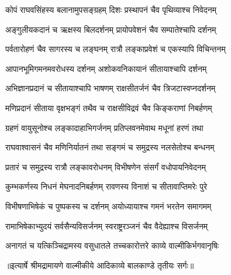 \twolineshloka
{कोपं राघवसिंहस्य बलानामुपसङ्ग्रहम्}
{दिशः प्रस्थापनं चैव पृथिव्याश्च निवेदनम्} %

\twolineshloka
{अङ्गुलीयकदानं च ऋक्षस्य बिलदर्शनम्}
{प्रायोपवेशनं चैव सम्पातेश्चापि दर्शनम्} %

\twolineshloka
{पर्वतारोहणं चैव सागरस्य च लङ्घनम्}
{रात्रौ लङ्काप्रवेशं च एकस्यापि विचिन्तनम्} %

\twolineshloka
{आपानभूमिगमनमवरोधस्य दर्शनम्}
{अशोकवनिकायानं सीतायाश्चापि दर्शनम्} %

\twolineshloka
{अभिज्ञानप्रदानं च सीतायाश्चापि भाषणम्}
{राक्षसीतर्जनं चैव त्रिजटास्वप्नदर्शनम्} %

\twolineshloka
{मणिप्रदानं सीताया वृक्षभङ्गं तथैव च}
{राक्षसीविद्रवं चैव किङ्कराणां निबर्हणम्} %

\twolineshloka
{ग्रहणं वायुसूनोश्च लङ्कादाहाभिगर्जनम्}
{प्रतिप्लवनमेवाथ मधूनां हरणं तथा} %

\twolineshloka
{राघवाश्वासनं चैव मणिनिर्यातनं तथा}
{सङ्गमं च समुद्रस्य नलसेतोश्च बन्धनम्} %

\twolineshloka
{प्रतारं च समुद्रस्य रात्रौ लङ्कावरोधनम्}
{विभीषणेन संसर्गं वधोपायनिवेदनम्} %

\twolineshloka
{कुम्भकर्णस्य निधनं मेघनादनिबर्हणम्}
{रावणस्य विनाशं च सीतावाप्तिमरेः पुरे} %

\twolineshloka
{विभीषणाभिषेकं च पुष्पकस्य च दर्शनम्}
{अयोध्यायाश्च गमनं भरतेन समागमम्} %

\twolineshloka
{रामाभिषेकाभ्युदयं सर्वसैन्यविसर्जनम्}
{स्वराष्ट्ररञ्जनं चैव वैदेह्याश्च विसर्जनम्} %

\twolineshloka
{अनागतं च यत्किञ्चिद्रामस्य वसुधातले}
{तच्चकारोत्तरे काव्ये वाल्मीकिर्भगवानृषिः} %


{॥इत्यार्षे श्रीमद्रामायणे वाल्मीकीये आदिकाव्ये बालकाण्डे तृतीयः सर्गः॥}

\closesection